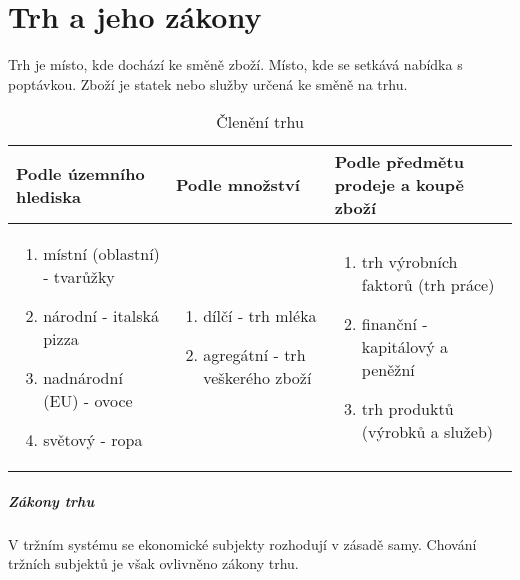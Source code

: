 \chapter{Trh a jeho zákony}

Trh je místo, kde dochází ke směně zboží. Místo, kde se setkává nabídka s poptávkou.
Zboží je statek nebo služby určená ke směně na trhu.

\begin{table}[h]
    \centering
    \caption{Členění trhu}
    \begin{tabular}{| p{5cm} | p{5cm} | p{5cm} |}
        \hline
        Podle územního hlediska &
        Podle množství &
        Podle předmětu prodeje a koupě zboží \\
        \hline
        \begin{enumerate}[label=(\alph*)]
            \item místní (oblastní) - tvarůžky
            \item národní - italská pizza 
            \item nadnárodní (EU) - ovoce 
            \item světový - ropa
        \end{enumerate} &
        \begin{enumerate}[label=(\alph*)]
            \item dílčí - trh mléka
            \item agregátní - trh veškerého zboží
        \end{enumerate} &
        \begin{enumerate}[label=(\alph*)]
            \item trh výrobních faktorů (trh práce)
            \item finanční - kapitálový a peněžní
            \item trh produktů (výrobků a služeb)
        \end{enumerate} \\
        \hline
    \end{tabular}
\end{table}

\paragraph*{Zákony trhu}

V tržním systému se ekonomické subjekty rozhodují v zásadě samy. Chování tržních subjektů je však ovlivněno zákony trhu.


